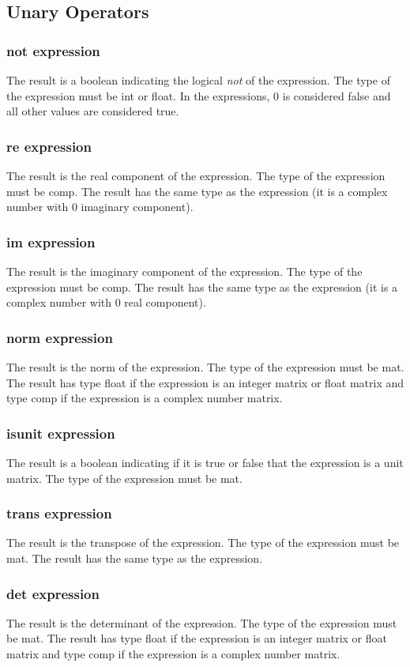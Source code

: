\subsection{Unary Operators}
\subsubsection{not expression}
The result is a boolean indicating the logical \textit{not} of the expression. The type of the expression must be int or float. In the expressions, 0 is considered false and all other values are considered true.
\subsubsection{re expression}
The result is the real component of the expression. The type of the expression must be comp. The result has the same type as the expression (it is a complex number with  0 imaginary component).
\subsubsection{im expression}
The result is the imaginary component of the expression. The type of the expression must be comp. The result has the same type as the expression (it is a complex number with  0 real component).
\subsubsection{norm expression}
The result is the norm of the expression. The type of the expression must be mat. The result has type float if the expression is an integer matrix or float matrix and type comp if the expression is a complex number matrix.
\subsubsection{isunit expression}
The result is a boolean indicating if it is true or false that the expression is a unit matrix. The type of the expression must be mat.
\subsubsection{trans expression}
The result is the transpose of the expression. The type of the expression must be mat. The result has the same type as the expression.
\subsubsection{det expression}
The result is the determinant of the expression. The type of the expression must be mat. The result has type float if the expression is an integer matrix or float matrix and type comp if the expression is a complex number matrix.
